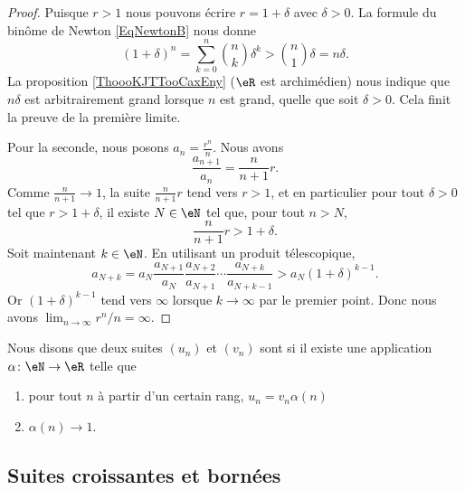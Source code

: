\begin{proof}
	Puisque \( r>1\) nous pouvons écrire \( r=1+\delta\) avec \( \delta>0\). La formule du binôme de Newton \eqref{EqNewtonB} nous donne
	\begin{equation}
		(1+\delta)^n=\sum_{k=0}^n{n\choose k}\delta^k>{n\choose 1}\delta=n\delta.
	\end{equation}
	La proposition \ref{ThoooKJTTooCaxEny} (\( \eR\) est archimédien) nous indique que \( n\delta\) est arbitrairement grand lorsque \( n\) est grand, quelle que soit \( \delta>0\). Cela finit la preuve de la première limite.

	Pour la seconde, nous posons \( a_n=\frac{ r^n }{ n }\). Nous avons
	\begin{equation}
		\frac{ a_{n+1} }{ a_n }=\frac{ n }{ n+1 }r.
	\end{equation}
	Comme \( \frac{ n }{ n+1 }\to 1\), la suite \( \frac{ n }{ n+1 }r\) tend vers \( r>1\), et en particulier pour tout \( \delta>0\) tel que \( r>1+\delta\), il existe \( N\in \eN\) tel que, pour tout \( n > N \),
	\begin{equation}
		\frac{ n }{ n+1 }r>1+\delta.
	\end{equation}
	Soit maintenant \( k\in \eN\). En utilisant un produit télescopique,
	\begin{equation}
		a_{N+k}=a_N\frac{ a_{N+1} }{ a_N }\frac{ a_{N+2} }{ a_{N+1} }\cdots\frac{ a_{N+k} }{ a_{N+k-1} }>a_N(1+\delta)^{k-1}.
	\end{equation}
	Or \( (1+\delta)^{k-1}\) tend vers \( \infty\) lorsque \( k\to \infty\) par le premier point. Donc nous avons \( \lim_{n\to \infty} r^n/n=\infty\).
\end{proof}

\begin{definition}      \label{DEFooEWRTooKgShmT}
	Nous disons que deux suites \( (u_n)\) et \( (v_n)\) sont  si il existe une application \( \alpha\colon \eN\to \eR\) telle que
	\begin{enumerate}
		\item
		      pour tout \( n\) à partir d'un certain rang, \( u_n=v_n\alpha(n)\)
		\item
		      \( \alpha(n)\to 1\).
	\end{enumerate}
\end{definition}

\subsection{Suites croissantes et bornées}

